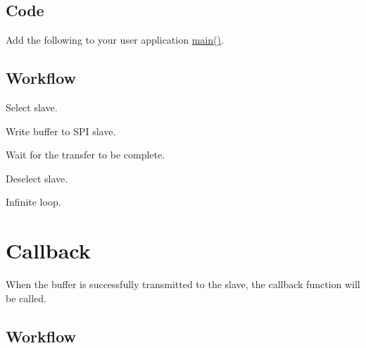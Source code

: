 \hypertarget{asfdoc_sam0_sercom_spi_master_callback_use_asfdoc_sam0_sercom_spi_master_callback_use_case_code}{}\subsection{Code}\label{asfdoc_sam0_sercom_spi_master_callback_use_asfdoc_sam0_sercom_spi_master_callback_use_case_code}
Add the following to your user application {\ttfamily \mbox{\hyperlink{csc__app_8c_a840291bc02cba5474a4cb46a9b9566fe}{main()}}}. 
\begin{DoxyCodeInclude}{0}
\end{DoxyCodeInclude}
\hypertarget{asfdoc_sam0_sercom_spi_master_callback_use_asfdoc_sam0_sercom_spi_master_callback_use_case_workflow}{}\subsection{Workflow}\label{asfdoc_sam0_sercom_spi_master_callback_use_asfdoc_sam0_sercom_spi_master_callback_use_case_workflow}

\begin{DoxyEnumerate}
\item Select slave. 
\begin{DoxyCodeInclude}{0}
\end{DoxyCodeInclude}

\item Write buffer to S\+PI slave. 
\begin{DoxyCodeInclude}{0}
\end{DoxyCodeInclude}

\item Wait for the transfer to be complete. 
\begin{DoxyCodeInclude}{0}
\end{DoxyCodeInclude}

\item Deselect slave. 
\begin{DoxyCodeInclude}{0}
\end{DoxyCodeInclude}

\item Infinite loop. 
\begin{DoxyCodeInclude}{0}
\end{DoxyCodeInclude}
 
\end{DoxyEnumerate}\hypertarget{asfdoc_sam0_sercom_spi_master_callback_use_asfdoc_sam0_sercom_spi_master_callback_use_callback}{}\section{Callback}\label{asfdoc_sam0_sercom_spi_master_callback_use_asfdoc_sam0_sercom_spi_master_callback_use_callback}
When the buffer is successfully transmitted to the slave, the callback function will be called. \hypertarget{asfdoc_sam0_sercom_spi_master_callback_use_asfdoc_sam0_sercom_spi_master_callback_use_callback_workflow}{}\subsection{Workflow}\label{asfdoc_sam0_sercom_spi_master_callback_use_asfdoc_sam0_sercom_spi_master_callback_use_callback_workflow}

